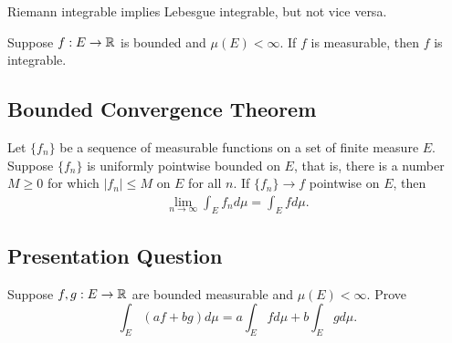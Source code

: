 \documentclass[class=book, crop=false]{standalone}
\begin{document}
        \begin{definition}
            Riemann integrable implies Lebesgue integrable, but not vice versa.
        \end{definition}

        \begin{theorem}
            Suppose $f : E \rightarrow \mathbb{R}$ is bounded and $\mu(E) < \infty$. If $f$ is measurable, then $f$ is integrable.
        \end{theorem}

        \subsection{Bounded Convergence Theorem}
        \begin{theorem}
            Let $\{f_n\}$ be a sequence of measurable functions on a set of finite measure $E$. Suppose $\{f_n\}$ is uniformly pointwise bounded on $E$, that is, there is a number $M \geq 0$ for which $|f_n| \leq M$ on $E$ for all $n$. If $\{f_n\} \rightarrow f$ pointwise on $E$, then
            \begin{align*}
                \lim_{n \rightarrow \infty} \int_E f_n d\mu = \int_E f d\mu.
            \end{align*}
        \end{theorem}
        
        \subsection{Presentation Question}
        \begin{question}
            Suppose $f, g: E \rightarrow \mathbb{R}$ are bounded measurable and $\mu(E) < \infty$. Prove
            \begin{equation*}
                \int_{E} (af + bg) d\mu = a\int_{E} f d\mu + b \int_{E} g d\mu.
            \end{equation*}
        \end{question}
\end{document}
